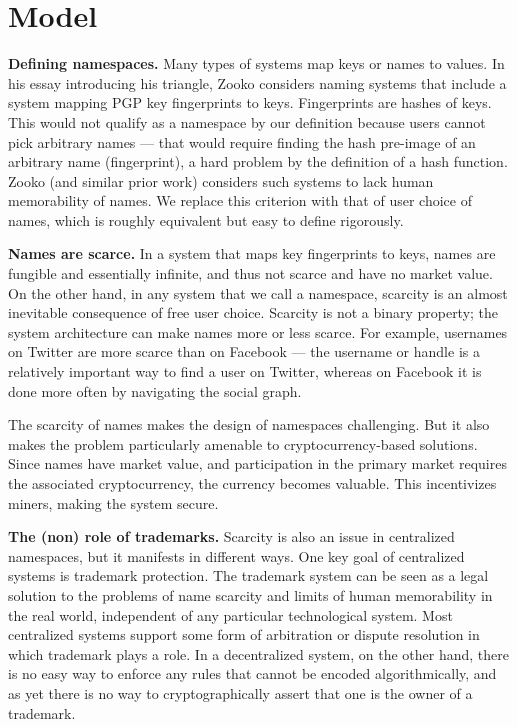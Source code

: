 \section{Model}
\label{sec:model}

{\bf Defining namespaces.} Many types of systems map keys or names to values. In his essay introducing his triangle, Zooko considers naming systems that include a system mapping PGP key fingerprints to keys. Fingerprints are hashes of keys. This would not qualify as a namespace by our definition because users cannot pick arbitrary names --- that would require finding the hash pre-image of an arbitrary name (fingerprint), a hard problem by the definition of a hash function. Zooko (and similar prior work) considers such systems to lack human memorability of names. We replace this criterion with that of user choice of names, which is roughly equivalent but easy to define rigorously. 

{\bf Names are scarce.} In a system that maps key fingerprints to keys, names are fungible and essentially infinite, and thus not scarce and have no market value. On the other hand, in any system that we call a namespace, scarcity is an almost inevitable consequence of free user choice. Scarcity is not a binary property; the system architecture can make names more or less scarce. For example, usernames on Twitter are more scarce than on Facebook --- the username or handle is a relatively important way to find a user on Twitter, whereas on Facebook it is done more often by navigating the social graph.

The scarcity of names makes the design of namespaces challenging. But it also makes the problem particularly amenable to cryptocurrency-based solutions. Since names have market value, and participation in the primary market requires the associated cryptocurrency, the currency becomes valuable. This incentivizes miners, making the system secure.

{\bf The (non) role of trademarks.} Scarcity is also an issue in centralized namespaces, but it manifests in different ways. One key goal of centralized systems is trademark protection. The trademark system can be seen as a legal solution to the problems of name scarcity and limits of human memorability in the real world, independent of any particular technological system. Most centralized systems support some form of arbitration or dispute resolution in which trademark plays a role. In a decentralized system, on the other hand, there is no easy way to enforce any rules that cannot be encoded algorithmically, and as yet there is no way to cryptographically assert that one is the owner of a trademark.

